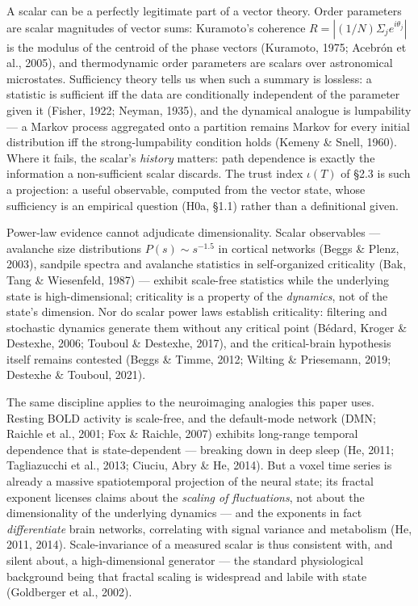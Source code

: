 \documentclass[11pt,twocolumn]{article}
\theoremstyle{gttdef}
\theoremstyle{gttplain}
\begin{document}
A scalar can be a perfectly legitimate part of a vector theory. Order parameters are scalar magnitudes of vector sums: Kuramoto's coherence $R = |(1/N)\Sigma_j e^{i\theta_j}|$ is the modulus of the centroid of the phase vectors (Kuramoto, 1975; Acebr\'on et al., 2005), and thermodynamic order parameters are scalars over astronomical microstates. Sufficiency theory tells us when such a summary is lossless: a statistic is sufficient iff the data are conditionally independent of the parameter given it (Fisher, 1922; Neyman, 1935), and the dynamical analogue is lumpability --- a Markov process aggregated onto a partition remains Markov for every initial distribution iff the strong-lumpability condition holds (Kemeny \& Snell, 1960). Where it fails, the scalar's \emph{history} matters: path dependence is exactly the information a non-sufficient scalar discards. The trust index $\iota(T)$ of \S{}2.3 is such a projection: a useful observable, computed from the vector state, whose sufficiency is an empirical question (H0a, \S{}1.1) rather than a definitional given.

Power-law evidence cannot adjudicate dimensionality. Scalar observables --- avalanche size distributions $P(s) \sim s^{-1.5}$ in cortical networks (Beggs \& Plenz, 2003), sandpile spectra and avalanche statistics in self-organized criticality (Bak, Tang \& Wiesenfeld, 1987) --- exhibit scale-free statistics while the underlying state is high-dimensional; criticality is a property of the \emph{dynamics}, not of the state's dimension. Nor do scalar power laws establish criticality: filtering and stochastic dynamics generate them without any critical point (B\'edard, Kroger \& Destexhe, 2006; Touboul \& Destexhe, 2017), and the critical-brain hypothesis itself remains contested (Beggs \& Timme, 2012; Wilting \& Priesemann, 2019; Destexhe \& Touboul, 2021).

The same discipline applies to the neuroimaging analogies this paper uses. Resting BOLD activity is scale-free, and the default-mode network (DMN; Raichle et al., 2001; Fox \& Raichle, 2007) exhibits long-range temporal dependence that is state-dependent --- breaking down in deep sleep (He, 2011; Tagliazucchi et al., 2013; Ciuciu, Abry \& He, 2014). But a voxel time series is already a massive spatiotemporal projection of the neural state; its fractal exponent licenses claims about the \emph{scaling of fluctuations}, not about the dimensionality of the underlying dynamics --- and the exponents in fact \emph{differentiate} brain networks, correlating with signal variance and metabolism (He, 2011, 2014). Scale-invariance of a measured scalar is thus consistent with, and silent about, a high-dimensional generator --- the standard physiological background being that fractal scaling is widespread and labile with state (Goldberger et al., 2002).
\end{document}
